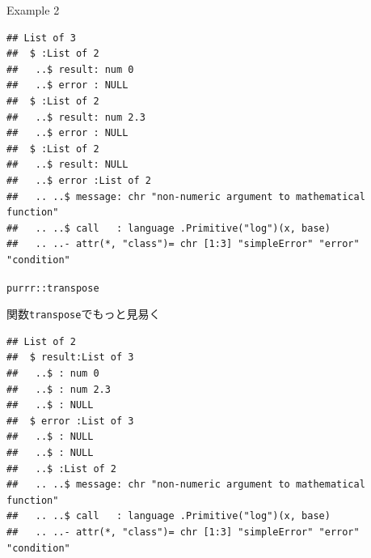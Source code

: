 \documentclass[ignorenonframetext,]{beamer}
\newenvironment{Shaded}{\begin{snugshade}}{\end{snugshade}}
\newcommand{\KeywordTok}[1]{\textcolor[rgb]{0.13,0.29,0.53}{\textbf{#1}}}
\newcommand{\DecValTok}[1]{\textcolor[rgb]{0.00,0.00,0.81}{#1}}
\newcommand{\StringTok}[1]{\textcolor[rgb]{0.31,0.60,0.02}{#1}}
\newcommand{\OperatorTok}[1]{\textcolor[rgb]{0.81,0.36,0.00}{\textbf{#1}}}
\newcommand{\NormalTok}[1]{#1}
\begin{document}
\begin{frame}[fragile]{Example 2}

\begin{Shaded}
\end{Shaded}

\begin{verbatim}
## List of 3
##  $ :List of 2
##   ..$ result: num 0
##   ..$ error : NULL
##  $ :List of 2
##   ..$ result: num 2.3
##   ..$ error : NULL
##  $ :List of 2
##   ..$ result: NULL
##   ..$ error :List of 2
##   .. ..$ message: chr "non-numeric argument to mathematical function"
##   .. ..$ call   : language .Primitive("log")(x, base)
##   .. ..- attr(*, "class")= chr [1:3] "simpleError" "error" "condition"
\end{verbatim}

\end{frame}

\begin{frame}[fragile]{\texttt{purrr::transpose}}

関数\texttt{transpose}でもっと見易く

\begin{Shaded}
\end{Shaded}

\begin{verbatim}
## List of 2
##  $ result:List of 3
##   ..$ : num 0
##   ..$ : num 2.3
##   ..$ : NULL
##  $ error :List of 3
##   ..$ : NULL
##   ..$ : NULL
##   ..$ :List of 2
##   .. ..$ message: chr "non-numeric argument to mathematical function"
##   .. ..$ call   : language .Primitive("log")(x, base)
##   .. ..- attr(*, "class")= chr [1:3] "simpleError" "error" "condition"
\end{verbatim}

\end{frame}
\end{document}
